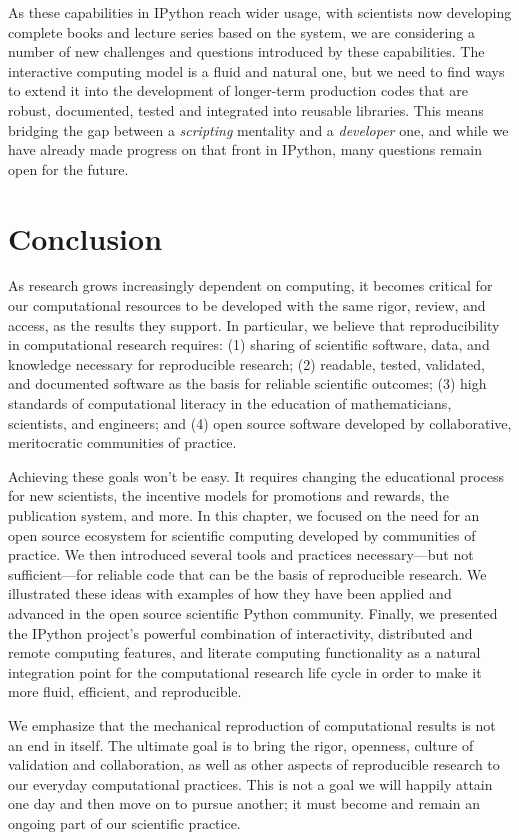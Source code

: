 \documentclass[ChapterTOCs,krantz2]{krantz} %
\begin{document}
As these capabilities in IPython reach wider usage, with scientists now
developing complete books and lecture series based on the system, we are
considering a number of new challenges and questions introduced by these
capabilities.  The interactive computing model is a fluid and natural one, but
we need to find ways to extend it into the development of longer-term
production codes that are robust, documented, tested and integrated into
reusable libraries.  This means bridging the gap between a \emph{scripting}
mentality and a \emph{developer} one, and while we have already made progress on
that front in IPython, many questions remain open for the future.

\section{Conclusion}\label{conclusion}

As research grows increasingly dependent on computing, it becomes critical for
our computational resources to be developed with the same rigor, review,
and access, as the results they support. In particular, we believe that
reproducibility in computational research requires: (1) sharing of scientific
software, data, and knowledge necessary for reproducible research; (2)
readable, tested, validated, and documented software as the basis for reliable
scientific outcomes; (3) high standards of computational literacy in the
education of mathematicians, scientists, and engineers; and (4) open source
software developed by collaborative, meritocratic communities of practice.

Achieving these goals won't be easy.  It requires changing the educational
process for new scientists, the incentive models for promotions and rewards,
the publication system, and more. In this chapter, we focused on the need for
an open source ecosystem for scientific computing developed by communities of
practice.  We then introduced several tools and practices necessary---but
not sufficient---for reliable code that can be the basis of
reproducible research.  We illustrated these ideas with examples of how they
have been applied and advanced in the open source scientific Python community.
Finally, we presented the IPython project's powerful combination of
interactivity, distributed and remote computing features, and literate
computing functionality as a natural integration point for the computational
research life cycle in order to make it more fluid, efficient, and
reproducible.

We emphasize that the mechanical reproduction of computational results
is not an end in itself.  The ultimate goal is to bring the rigor, openness,
culture of validation and collaboration, as well as other aspects of
reproducible research to our everyday computational practices. This is not a
goal we will happily attain one day and then move on to pursue another;
it must become and remain an ongoing part of our scientific practice.
\end{document}
